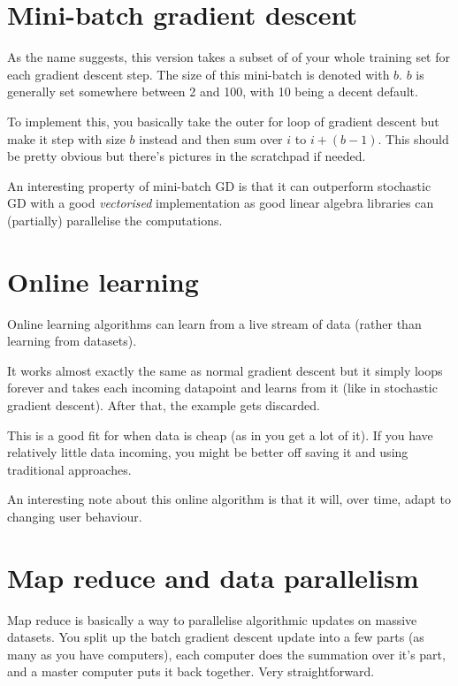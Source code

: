 \section{Mini-batch gradient descent}

As the name suggests, this version takes a subset of of your whole training set for each gradient descent step. The size of this mini-batch is denoted with $b$. $b$ is generally set somewhere between 2 and 100, with 10 being a decent default.

To implement this, you basically take the outer for loop of gradient descent but make it step with size $b$ instead and then sum over $i$ to $i + (b -1)$. This should be pretty obvious but there's pictures in the scratchpad if needed.

An interesting property of mini-batch GD is that it can outperform stochastic GD with a good \emph{vectorised} implementation as good linear algebra libraries can (partially) parallelise the computations.

\section{Online learning}

Online learning algorithms can learn from a live stream of data (rather than learning from datasets).

It works almost exactly the same as normal gradient descent but it simply loops forever and takes each incoming datapoint and learns from it (like in stochastic gradient descent). After that, the example gets discarded.

This is a good fit for when data is cheap (as in you get a lot of it). If you have relatively little data incoming, you might be better off saving it and using traditional approaches.

An interesting note about this online algorithm is that it will, over time, adapt to changing user behaviour.

\section{Map reduce and data parallelism}

Map reduce is basically a way to parallelise algorithmic updates on massive datasets. You split up the batch gradient descent update into a few parts (as many as you have computers), each computer does the summation over it's part, and a master computer puts it back together. Very straightforward.

